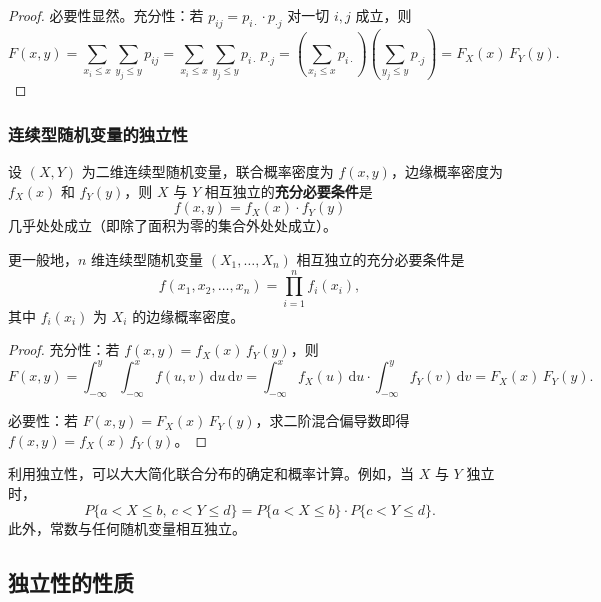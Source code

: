 ﻿\documentclass[lang=cn,11pt]{elegantbook}
\begin{document}
\begin{proof}
必要性显然。充分性：若 $p_{ij} = p_{i\cdot} \cdot p_{\cdot j}$ 对一切 $i,j$ 成立，则
\[
F(x,y) = \sum_{x_i \leqslant x}\sum_{y_j \leqslant y}p_{ij} = \sum_{x_i \leqslant x}\sum_{y_j \leqslant y}p_{i\cdot}\,p_{\cdot j} = \left(\sum_{x_i \leqslant x}p_{i\cdot}\right)\left(\sum_{y_j \leqslant y}p_{\cdot j}\right) = F_X(x)\,F_Y(y).
\]
\end{proof}

\subsubsection{连续型随机变量的独立性}

\begin{theorem}[连续型随机变量独立的判定]\label{thm:continuous-independence}
设 $(X,Y)$ 为二维连续型随机变量，联合概率密度为 $f(x,y)$，边缘概率密度为 $f_X(x)$ 和 $f_Y(y)$，则 $X$ 与 $Y$ 相互独立的\textbf{充分必要条件}是
\[
f(x,y) = f_X(x) \cdot f_Y(y)
\]
几乎处处成立（即除了面积为零的集合外处处成立）。

更一般地，$n$ 维连续型随机变量 $(X_1, \dots, X_n)$ 相互独立的充分必要条件是
\[
f(x_1, x_2, \dots, x_n) = \prod_{i=1}^{n}f_i(x_i),
\]
其中 $f_i(x_i)$ 为 $X_i$ 的边缘概率密度。
\end{theorem}

\begin{proof}
充分性：若 $f(x,y) = f_X(x)\,f_Y(y)$，则
\[
F(x,y) = \int_{-\infty}^{y}\int_{-\infty}^{x}f(u,v)\,\mathrm{d}u\,\mathrm{d}v = \int_{-\infty}^{x}f_X(u)\,\mathrm{d}u \cdot \int_{-\infty}^{y}f_Y(v)\,\mathrm{d}v = F_X(x)\,F_Y(y).
\]

必要性：若 $F(x,y) = F_X(x)\,F_Y(y)$，求二阶混合偏导数即得 $f(x,y) = f_X(x)\,f_Y(y)$。
\end{proof}

\begin{note}
利用独立性，可以大大简化联合分布的确定和概率计算。例如，当 $X$ 与 $Y$ 独立时，
\[
P\{a < X \leqslant b,\ c < Y \leqslant d\} = P\{a < X \leqslant b\} \cdot P\{c < Y \leqslant d\}.
\]
此外，常数与任何随机变量相互独立。
\end{note}

\subsection{独立性的性质}
\end{document}
